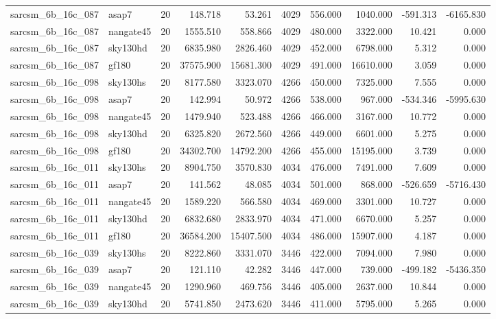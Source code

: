 \begin{longtable}{llrrrrrrrr}
sarcsm\_6b\_16c\_087 & asap7 & 20 & 148.718 & 53.261 & 4029 & 556.000 & 1040.000 & -591.313 & -6165.830 \\
sarcsm\_6b\_16c\_087 & nangate45 & 20 & 1555.510 & 558.866 & 4029 & 480.000 & 3322.000 & 10.421 & 0.000 \\
sarcsm\_6b\_16c\_087 & sky130hd & 20 & 6835.980 & 2826.460 & 4029 & 452.000 & 6798.000 & 5.312 & 0.000 \\
sarcsm\_6b\_16c\_087 & gf180 & 20 & 37575.900 & 15681.300 & 4029 & 491.000 & 16610.000 & 3.059 & 0.000 \\
sarcsm\_6b\_16c\_098 & sky130hs & 20 & 8177.580 & 3323.070 & 4266 & 450.000 & 7325.000 & 7.555 & 0.000 \\
sarcsm\_6b\_16c\_098 & asap7 & 20 & 142.994 & 50.972 & 4266 & 538.000 & 967.000 & -534.346 & -5995.630 \\
sarcsm\_6b\_16c\_098 & nangate45 & 20 & 1479.940 & 523.488 & 4266 & 466.000 & 3167.000 & 10.772 & 0.000 \\
sarcsm\_6b\_16c\_098 & sky130hd & 20 & 6325.820 & 2672.560 & 4266 & 449.000 & 6601.000 & 5.275 & 0.000 \\
sarcsm\_6b\_16c\_098 & gf180 & 20 & 34302.700 & 14792.200 & 4266 & 455.000 & 15195.000 & 3.739 & 0.000 \\
sarcsm\_6b\_16c\_011 & sky130hs & 20 & 8904.750 & 3570.830 & 4034 & 476.000 & 7491.000 & 7.609 & 0.000 \\
sarcsm\_6b\_16c\_011 & asap7 & 20 & 141.562 & 48.085 & 4034 & 501.000 & 868.000 & -526.659 & -5716.430 \\
sarcsm\_6b\_16c\_011 & nangate45 & 20 & 1589.220 & 566.580 & 4034 & 469.000 & 3301.000 & 10.727 & 0.000 \\
sarcsm\_6b\_16c\_011 & sky130hd & 20 & 6832.680 & 2833.970 & 4034 & 471.000 & 6670.000 & 5.257 & 0.000 \\
sarcsm\_6b\_16c\_011 & gf180 & 20 & 36584.200 & 15407.500 & 4034 & 486.000 & 15907.000 & 4.187 & 0.000 \\
sarcsm\_6b\_16c\_039 & sky130hs & 20 & 8222.860 & 3331.070 & 3446 & 422.000 & 7094.000 & 7.980 & 0.000 \\
sarcsm\_6b\_16c\_039 & asap7 & 20 & 121.110 & 42.282 & 3446 & 447.000 & 739.000 & -499.182 & -5436.350 \\
sarcsm\_6b\_16c\_039 & nangate45 & 20 & 1290.960 & 469.756 & 3446 & 405.000 & 2637.000 & 10.844 & 0.000 \\
sarcsm\_6b\_16c\_039 & sky130hd & 20 & 5741.850 & 2473.620 & 3446 & 411.000 & 5795.000 & 5.265 & 0.000 \\

\end{longtable}

